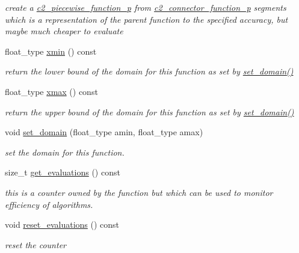 \begin{DoxyCompactItemize}
\begin{DoxyCompactList}\small\item\em create a \hyperlink{classc2__piecewise__function__p}{c2\+\_\+piecewise\+\_\+function\+\_\+p} from \hyperlink{classc2__connector__function__p}{c2\+\_\+connector\+\_\+function\+\_\+p} segments which is a representation of the parent function to the specified accuracy, but maybe much cheaper to evaluate \end{DoxyCompactList}\item 
float\+\_\+type \hyperlink{classc2__function_acddff2d033c7f3205658e246d806204b}{xmin} () const 
\begin{DoxyCompactList}\small\item\em return the lower bound of the domain for this function as set by \hyperlink{classc2__function_adeb70da9c75011e9abd71142dca4c22e}{set\+\_\+domain()} \end{DoxyCompactList}\item 
float\+\_\+type \hyperlink{classc2__function_a7f3ac790b6659b2d137f4c90eadb6ef0}{xmax} () const 
\begin{DoxyCompactList}\small\item\em return the upper bound of the domain for this function as set by \hyperlink{classc2__function_adeb70da9c75011e9abd71142dca4c22e}{set\+\_\+domain()} \end{DoxyCompactList}\item 
void \hyperlink{classc2__function_adeb70da9c75011e9abd71142dca4c22e}{set\+\_\+domain} (float\+\_\+type amin, float\+\_\+type amax)
\begin{DoxyCompactList}\small\item\em set the domain for this function. \end{DoxyCompactList}\item 
size\+\_\+t \hyperlink{classc2__function_ab6ff0c597019dfb38b1d3d76bfd71e6c}{get\+\_\+evaluations} () const 
\begin{DoxyCompactList}\small\item\em this is a counter owned by the function but which can be used to monitor efficiency of algorithms. \end{DoxyCompactList}\item 
void \hyperlink{classc2__function_a8003c40247b7255de5ffbcd3ec21e395}{reset\+\_\+evaluations} () const 
\begin{DoxyCompactList}\small\item\em reset the counter \end{DoxyCompactList}\item 

\end{DoxyCompactItemize}
